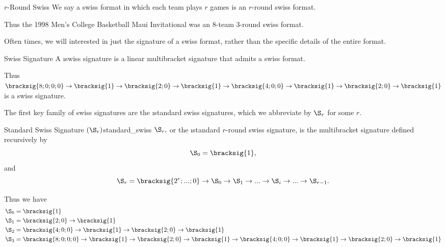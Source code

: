 {    %

    \begin{definition}{$r$-Round Swiss}{}
        We say a swiss format in which each team plays $r$ games is an $r$-round swiss format.
    \end{definition}

    Thus the 1998 Men's College Basketball Maui Invitational was an 8-team 3-round swiss format.

    Often times, we will interested in just the signature of a swiss format, rather than the specific details of the entire format.

    \begin{definition}{Swiss Signature}{}
        A \i{swiss signature} is a linear multibracket signature that admits a swiss format.
    \end{definition}

    Thus $\bracksig{8;0;0;0} \to \bracksig{1} \to \bracksig{2;0} \to \bracksig{1} \to \bracksig{4;0;0} \to \bracksig{1} \to \bracksig{2;0} \to \bracksig{1}$ is a swiss signature. 

    The first key family of swiss signatures are the \i{standard swiss signatures}, which we abbreviate by $\S_r$ for some $r$.

\begin{definition}{Standard Swiss Signature $(\S_r)$}{standard_swiss}
    $\S_r,$ or the \i{standard $r$-round swiss signature}, is the multibracket signature defined recursively by $$\S_0 = \bracksig{1},$$ and
    $$\S_r = \bracksig{2^r; ...; 0} \to \S_{0} \to \S_1 \to ... \to \S_i \to ... \to \S_{r-1}.$$
\end{definition}

Thus we have
\begin{align*}
    \S_0 =\; &\bracksig{1}\\
    \S_1 =\; &\bracksig{2;0} \to \bracksig{1}\\
    \S_2 =\; &\bracksig{4;0;0} \to \bracksig{1} \to \bracksig{2;0} \to \bracksig{1}\\
    \S_3 =\; &\bracksig{8;0;0;0} \to \bracksig{1} \to \bracksig{2;0} \to \bracksig{1} \to \bracksig{4;0;0} \to \bracksig{1} \to \bracksig{2;0} \to \bracksig{1}
\end{align*}

}
